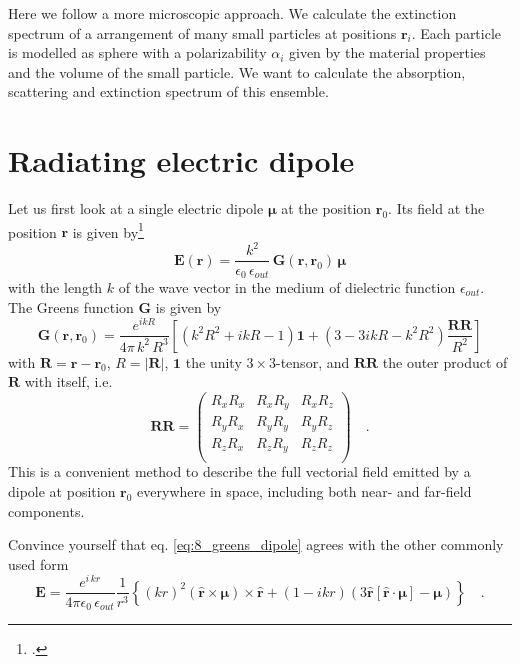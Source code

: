 Here we follow a more microscopic approach. We calculate the extinction spectrum of a  arrangement of  many small particles at positions $\mathbf{r}_i$.
Each  particle is modelled as sphere  with a  polarizability $\alpha_i$ given by the material properties and the volume of the small particle. We want to calculate the absorption, scattering and extinction spectrum of this  ensemble.


\section{Radiating electric dipole}

Let us first look at a single electric dipole $\boldsymbol{\mu}$ at the position $\mathbf{r}_0$. Its field at the position $\mathbf{r}$ is given by\footcite[eq. 8.52]{Novotny-Hecht2012} 
\begin{equation}
\mathbf{E}(\mathbf{r}) = \frac{k^2}{\epsilon_0 \, \epsilon_{out}} \, \mathbf{G}(\mathbf{r}, \mathbf{r}_0) \,  \boldsymbol{\mu}
\end{equation}
with the length $k$ of the wave vector in the medium of dielectric function $\epsilon_{out}$.
The Greens function $\mathbf{G}$ is given by
\begin{equation}
\mathbf{G}(\mathbf{r}, \mathbf{r}_0) = \frac{e^{i k R} }{4 \pi \, k^2 \, R^3 } 
\left[  
 \left( k^2 R^2 + i k R  - 1 \right) \mathbf{1}  +    
  \left( 3 - 3 i k R - k^2 R^2  \right) \frac{\mathbf{RR}}{R^2}   
  \right] \label{eq:8_greens_dipole}
\end{equation}
with $\mathbf{R} = \mathbf{r} - \mathbf{r}_0$, $R = |\mathbf{R}|$, $\mathbf{1}$ the unity $3 \times 3$-tensor, and $\mathbf{RR}$ the outer product of $\mathbf{R}$ with itself, i.e.
\begin{equation}
\mathbf{RR} = 
\begin{pmatrix}
R_x R_x &  R_x R_y & R_x R_z \\
R_y R_x &  R_y R_y & R_y R_z \\
R_z R_x &  R_z R_y & R_z R_z \\
\end{pmatrix} \quad .
\end{equation}
This is a convenient method to describe the full vectorial field emitted by a dipole at position  $\mathbf{r}_0$ everywhere in space, including both near- and far-field components.

\begin{questions}
\item Convince yourself that eq. \ref{eq:8_greens_dipole} agrees with the other commonly used form 
\begin{equation}
  \mathbf{E} = \frac{ e^{i \, k  r} }{4\pi\epsilon_0 \, \epsilon_{out}}  \frac{1}{r^3}\left\{
      (k r )^2 \left( \hat{\mathbf{r}} \times \boldsymbol{\mu} \right) \times \hat{\mathbf{r}} +
      \left( 1 -  i k r \right)
        \left( 3\hat{\mathbf{r}} \left[\hat{\mathbf{r}} \cdot \boldsymbol{\mu}\right] - \boldsymbol{\mu} \right)
    \right\} \quad .
\end{equation}
\end{questions}

